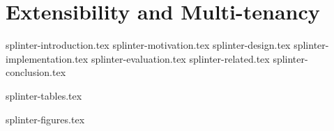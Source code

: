 \chapter{Extensibility and Multi-tenancy}

 {splinter-introduction.tex}
 {splinter-motivation.tex}
 {splinter-design.tex}
 {splinter-implementation.tex}
 {splinter-evaluation.tex}
 {splinter-related.tex}
 {splinter-conclusion.tex}

\clearpage

 {splinter-tables.tex}

\clearpage

 {splinter-figures.tex}
